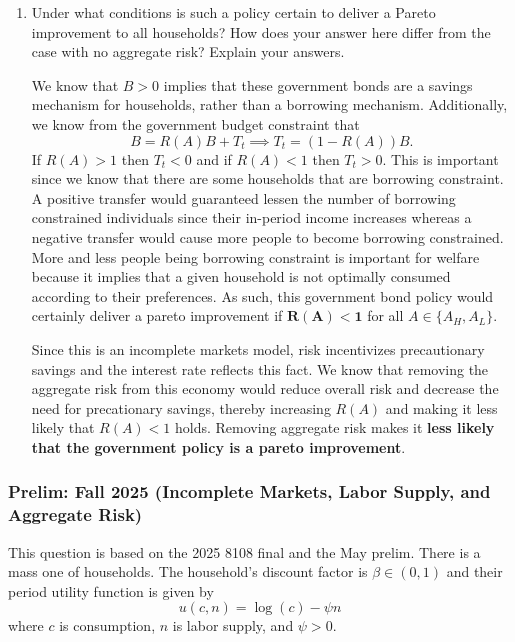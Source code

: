 \documentclass[11pt,english]{article}
\begin{document}
\begin{enumerate}[label = (\alph*)]
\begin{solution}
\begin{itemize}
\item \underline{Same - Euler Condition:} We derived this in a manner that was independent of asset holdings. Specifically we know that since both assets $a'$ and $b'$ earn the same return, their handling in the first order conditions and envelope condition are the same and we will still get an expression for $R$ that is solely dependent on $A$.
\end{itemize}
\end{solution}
  \item Under what conditions is such a policy certain to deliver a Pareto improvement to all households? How does your answer here differ from the case with no aggregate risk? Explain your answers.
 \begin{solution}
We know that $B > 0$ implies that these government bonds are a savings mechanism for households, rather than a borrowing mechanism. Additionally, we know from the government budget constraint that $$B = R(A)B + T_t \implies T_t = (1 - R(A))B.$$
If $R(A) > 1$ then $T_t < 0$ and if $R(A) < 1$ then $T_t > 0$. This is important since we know that there are some households that are borrowing constraint. A positive transfer would guaranteed lessen the number of borrowing constrained individuals since their in-period income increases whereas a negative transfer would cause more people to become borrowing constrained. More and less people being borrowing constraint is important for welfare because it implies that a given household is not optimally consumed according to their preferences. As such, this government bond policy would certainly deliver a pareto improvement if $\pmb{R(A) < 1}$ for all $A\in \{A_H, A_L\}$.

Since this is an incomplete markets model, risk incentivizes precautionary savings and the interest rate reflects this fact. We know that removing the aggregate risk from this economy would reduce overall risk and decrease the need for precationary savings, thereby increasing $R(A)$ and making it less likely that $R(A)<1$ holds. Removing aggregate risk makes it \textbf{less likely that the government policy is a pareto improvement}.
\end{solution}
\end{enumerate}

\subsubsection{Prelim: Fall 2025 (Incomplete Markets, Labor Supply, and Aggregate Risk)}
This question is based on the 2025 8108 final and the May prelim. There is a
mass one of households. The household's discount factor is $\beta \in (0,1)$
and their period utility function is given by
\[
    u(c, n) = \log(c) - \psi n
\]
where $c$ is consumption, $n$ is labor supply, and $\psi > 0$.
 
\end{document}
